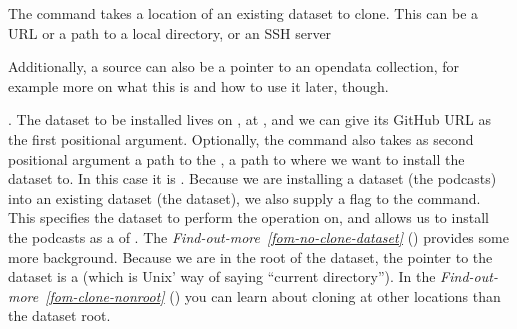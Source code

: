 \sphinxAtStartPar
The  command takes a location of an existing dataset to clone. This 
can be a URL or a path to a local directory, or an SSH server%
\begin{footnote}\sphinxAtStartFootnote
Additionally, a source can also be a pointer to an open\sphinxhyphen{}data collection,
for example {\hyperref[\detokenize{glossary:term-the-DataLad-superdataset}]{}} \textendash{} more on what this is and how to
use it later, though.
%
\end{footnote}. The dataset
to be installed lives on {\hyperref[\detokenize{glossary:term-GitHub}]{}}, at
,
and we can give its GitHub URL as the  first positional argument.
Optionally, the command also takes as second positional argument a path to the ,
\textendash{} a path to where we want to install the dataset to. In this case it is .
Because we are installing a dataset (the podcasts) into an existing dataset (the 
dataset), we also supply a  flag to the command.
This specifies the dataset to perform the operation on, and allows us to install
the podcasts as a  of .
The \textit{Find-out-more}~{\findoutmoreiconinline}\textit{\ref{fom-no-clone-dataset}} {\hyperref[\detokenize{basics/101-105-install:fom-no-clone-dataset}]{}} () provides some more background.
Because we are in the root
of the  dataset, the pointer to the dataset is a  (which is Unix’
way of saying “current directory”). In the \textit{Find-out-more}~{\findoutmoreiconinline}\textit{\ref{fom-clone-nonroot}} {\hyperref[\detokenize{basics/101-105-install:fom-clone-nonroot}]{}} ()
you can learn about cloning at other locations than the dataset root.

